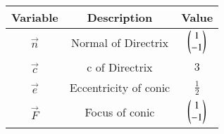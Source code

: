 \begin{tabular}[12pt]{ |c| c| c|}
    \hline
    \textbf{Variable} & \textbf{Description} & \textbf{Value}\\
	\hline
	$\vec{n}$ &Normal of Directrix& $\begin{pmatrix}1 \\ -1\end{pmatrix} $\\
	\hline
	$\vec{c}$ & c of Directrix& $ 3$\\
	\hline
	$\vec{e}$ & Eccentricity of conic & $\frac{1}{2}$\\
	\hline
	$\vec{F}$ & Focus of conic &  $\begin{pmatrix}1 \\ -1\end{pmatrix}$ \\
	\hline
\end{tabular}
